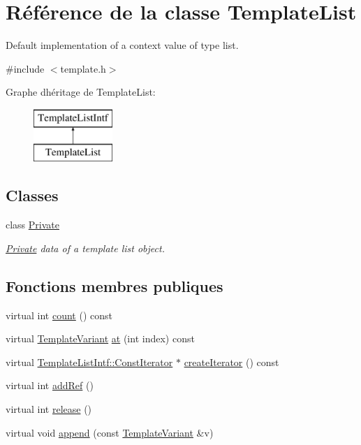 \hypertarget{class_template_list}{}\section{Référence de la classe Template\+List}
\label{class_template_list}


Default implementation of a context value of type list.  




{\ttfamily \#include $<$template.\+h$>$}

Graphe d\textquotesingle{}héritage de Template\+List\+:\begin{figure}[H]
\begin{center}
\leavevmode
\includegraphics[height=2.000000cm]{class_template_list}
\end{center}
\end{figure}
\subsection*{Classes}
\begin{DoxyCompactItemize}
\item 
class \hyperlink{class_template_list_1_1_private}{Private}
\begin{DoxyCompactList}\small\item\em \hyperlink{class_template_list_1_1_private}{Private} data of a template list object. \end{DoxyCompactList}\end{DoxyCompactItemize}
\subsection*{Fonctions membres publiques}
\begin{DoxyCompactItemize}
\item 
virtual int \hyperlink{class_template_list_a7b9074d1ddbd265b768261ad6b359e61}{count} () const 
\item 
virtual \hyperlink{class_template_variant}{Template\+Variant} \hyperlink{class_template_list_a7c766dc3b4eb1adf0e867382827176c9}{at} (int index) const 
\item 
virtual \hyperlink{class_template_list_intf_1_1_const_iterator}{Template\+List\+Intf\+::\+Const\+Iterator} $\ast$ \hyperlink{class_template_list_ab7e1c552851aad0581bcce40f248cd82}{create\+Iterator} () const 
\item 
virtual int \hyperlink{class_template_list_a144bf4bdc326ba570eba62b1dc90f32f}{add\+Ref} ()
\item 
virtual int \hyperlink{class_template_list_aeff3b4d0cf58bc2bd92de00c51cde488}{release} ()
\item 
virtual void \hyperlink{class_template_list_ad866913882089b08eb818f801c251aed}{append} (const \hyperlink{class_template_variant}{Template\+Variant} \&v)
\end{DoxyCompactItemize}
